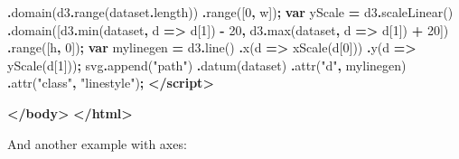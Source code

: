 \documentclass[
  openany]{book}
\newenvironment{Shaded}{\begin{snugshade}}{\end{snugshade}}
\newcommand{\AttributeTok}[1]{\textcolor[rgb]{0.77,0.63,0.00}{#1}}
\newcommand{\DecValTok}[1]{\textcolor[rgb]{0.00,0.00,0.81}{#1}}
\newcommand{\FunctionTok}[1]{\textcolor[rgb]{0.00,0.00,0.00}{#1}}
\newcommand{\KeywordTok}[1]{\textcolor[rgb]{0.13,0.29,0.53}{\textbf{#1}}}
\newcommand{\NormalTok}[1]{#1}
\newcommand{\OperatorTok}[1]{\textcolor[rgb]{0.81,0.36,0.00}{\textbf{#1}}}
\newcommand{\StringTok}[1]{\textcolor[rgb]{0.31,0.60,0.02}{#1}}
\begin{document}
\begin{Shaded}
\begin{Highlighting}[]
        \OperatorTok{.}\FunctionTok{domain}\NormalTok{(d3}\OperatorTok{.}\FunctionTok{range}\NormalTok{(dataset}\OperatorTok{.}\AttributeTok{length}\NormalTok{))}
        \OperatorTok{.}\FunctionTok{range}\NormalTok{([}\DecValTok{0}\OperatorTok{,}\NormalTok{ w])}\OperatorTok{;}
      \KeywordTok{var}\NormalTok{ yScale }\OperatorTok{=}\NormalTok{ d3}\OperatorTok{.}\FunctionTok{scaleLinear}\NormalTok{()}
        \OperatorTok{.}\FunctionTok{domain}\NormalTok{([d3}\OperatorTok{.}\FunctionTok{min}\NormalTok{(dataset}\OperatorTok{,}\NormalTok{ d }\KeywordTok{=\textgreater{}}\NormalTok{ d[}\DecValTok{1}\NormalTok{]) }\OperatorTok{{-}} \DecValTok{20}\OperatorTok{,}
\NormalTok{                 d3}\OperatorTok{.}\FunctionTok{max}\NormalTok{(dataset}\OperatorTok{,}\NormalTok{ d }\KeywordTok{=\textgreater{}}\NormalTok{ d[}\DecValTok{1}\NormalTok{]) }\OperatorTok{+} \DecValTok{20}\NormalTok{])}
        \OperatorTok{.}\FunctionTok{range}\NormalTok{([h}\OperatorTok{,} \DecValTok{0}\NormalTok{])}\OperatorTok{;}
      \KeywordTok{var}\NormalTok{ mylinegen }\OperatorTok{=}\NormalTok{ d3}\OperatorTok{.}\FunctionTok{line}\NormalTok{()}
        \OperatorTok{.}\FunctionTok{x}\NormalTok{(d }\KeywordTok{=\textgreater{}}\NormalTok{ xScale(d[}\DecValTok{0}\NormalTok{]))}
        \OperatorTok{.}\FunctionTok{y}\NormalTok{(d }\KeywordTok{=\textgreater{}}\NormalTok{ yScale(d[}\DecValTok{1}\NormalTok{]))}\OperatorTok{;}
\NormalTok{      svg}\OperatorTok{.}\FunctionTok{append}\NormalTok{(}\StringTok{"path"}\NormalTok{)}
         \OperatorTok{.}\FunctionTok{datum}\NormalTok{(dataset)}
         \OperatorTok{.}\FunctionTok{attr}\NormalTok{(}\StringTok{"d"}\OperatorTok{,}\NormalTok{ mylinegen)}
         \OperatorTok{.}\FunctionTok{attr}\NormalTok{(}\StringTok{"class"}\OperatorTok{,} \StringTok{"linestyle"}\NormalTok{)}\OperatorTok{;}
    \KeywordTok{\textless{}/script\textgreater{}}

  \KeywordTok{\textless{}/body\textgreater{}}
\KeywordTok{\textless{}/html\textgreater{}}
\end{Highlighting}
\end{Shaded}

And another example with axes:
\end{document}
